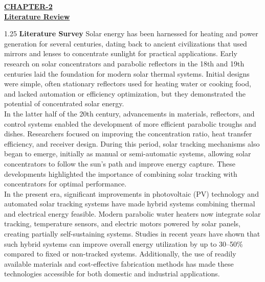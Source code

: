 \documentclass[12pt,a4paper]{article}
\begin{document}



\begin{center}
  {\fontsize{15}{18}\selectfont \bfseries \textcolor{red!80!black}{\underline{CHAPTER-2}}}\\[2mm]
  {\fontsize{16}{20}\selectfont \bfseries \textcolor{red!80!black}{\underline{Literature Review}}}\\[5mm]
\end{center}

\noindent
\begin{spacing}{1.25}
{\fontsize{10.2}{14.5}\selectfont
\textbf{Literature Survey} Solar energy has been harnessed for heating and power generation for several centuries, dating back to ancient civilizations that used mirrors and lenses to concentrate sunlight for practical applications. Early research on solar concentrators and parabolic reflectors in the 18th and 19th centuries laid the foundation for modern solar thermal systems. Initial designs were simple, often stationary reflectors used for heating water or cooking food, and lacked automation or efficiency optimization, but they demonstrated the potential of concentrated solar energy.\\[3.5mm]
In the latter half of the 20th century, advancements in materials, reflectors, and control systems enabled the development of more efficient parabolic troughs and dishes. Researchers focused on improving the concentration ratio, heat transfer efficiency, and receiver design. During this period, solar tracking mechanisms also began to emerge, initially as manual or semi-automatic systems, allowing solar concentrators to follow the sun's path and improve energy capture. These developments highlighted the importance of combining solar tracking with concentrators for optimal performance.\\[3.5mm]
In the present era, significant improvements in photovoltaic (PV) technology and automated solar tracking systems have made hybrid systems combining thermal and electrical energy feasible. Modern parabolic water heaters now integrate solar tracking, temperature sensors, and electric motors powered by solar panels, creating partially self-sustaining systems. Studies in recent years have shown that such hybrid systems can improve overall energy utilization by up to 30--50\% compared to fixed or non-tracked systems. Additionally, the use of readily available materials and cost-effective fabrication methods has made these technologies accessible for both domestic and industrial applications.\\[3.5mm]
}
\end{spacing}
\end{document}
